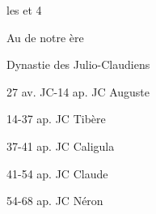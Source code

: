 \documentclass{article}
\begin{document}
les  et 4

Au  de notre ère


\begin{chronologie}{Dynastie des Julio-Claudiens}
  \item[27 av. JC-14 ap. JC] Auguste
  \item[14-37 ap. JC] Tibère
  \item[37-41 ap. JC] Caligula
  \item[41-54 ap. JC] Claude
  \item[54-68 ap. JC] Néron
\end{chronologie}
\end{document}
